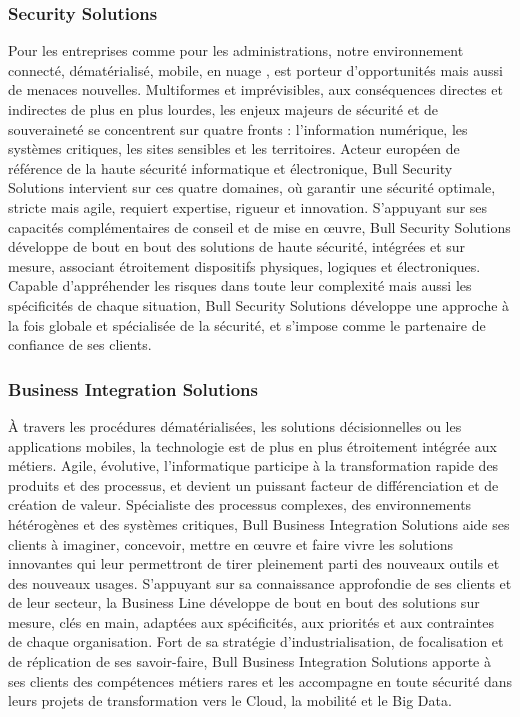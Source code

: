 \documentclass[11pt]{article}
\begin{document}
		\subsubsection{Security Solutions}
		Pour les entreprises comme pour les administrations, notre environnement connecté, dématérialisé, mobile, 
		\og en nuage \fg, est porteur d’opportunités mais aussi de menaces nouvelles. Multiformes et imprévisibles, aux conséquences 
		directes et indirectes de plus en plus lourdes, les enjeux majeurs de sécurité et de souveraineté se concentrent sur 
		quatre fronts : l’information numérique, les systèmes critiques, les sites sensibles et les territoires. Acteur 
		européen de référence de la haute sécurité informatique et électronique, Bull Security Solutions intervient sur ces 
		quatre domaines, où garantir une sécurité optimale, stricte mais agile, requiert expertise, rigueur et innovation. 
		S’appuyant sur ses capacités complémentaires de conseil et de mise en œuvre, Bull Security Solutions développe de 
		bout en bout des solutions de haute sécurité, intégrées et sur mesure, associant étroitement dispositifs physiques, 
		logiques et électroniques. Capable d’appréhender les risques dans toute leur complexité mais aussi les spécificités 
		de chaque situation, Bull Security Solutions développe une approche à la fois globale et spécialisée de la sécurité, 
		et s’impose comme le partenaire de confiance de ses clients.
		\subsubsection{Business Integration Solutions}
		À travers les procédures dématérialisées, les solutions décisionnelles ou les applications mobiles, la technologie 
		est de plus en plus étroitement intégrée aux métiers. Agile, évolutive, l’informatique participe à la transformation 
		rapide des produits et des processus, et devient un puissant facteur de différenciation et de création de valeur. 
		Spécialiste des processus complexes, des environnements hétérogènes et des systèmes critiques, Bull Business 
		Integration Solutions aide ses clients à imaginer, concevoir, mettre en œuvre et faire vivre les solutions innovantes 
		qui leur permettront de tirer pleinement parti des nouveaux outils et des nouveaux usages. S’appuyant sur sa 
		connaissance approfondie de ses clients et de leur secteur, la Business Line développe de bout en bout des solutions 
		sur mesure, clés en main, adaptées aux spécificités, aux priorités et aux contraintes de chaque organisation. Fort de 
		sa stratégie d’industrialisation, de focalisation et de réplication de ses savoir-faire, Bull Business Integration 
		Solutions apporte à ses clients des compétences métiers rares et les accompagne en toute sécurité dans leurs projets 
		de transformation vers le Cloud, la mobilité et le Big Data.
\end{document}

